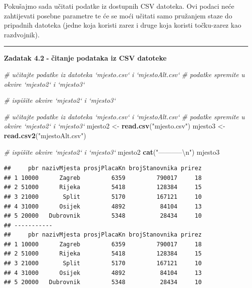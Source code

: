 \documentclass[]{book}
\newenvironment{Shaded}{\begin{snugshade}}{\end{snugshade}}
\newcommand{\KeywordTok}[1]{\textcolor[rgb]{0.13,0.29,0.53}{\textbf{#1}}}
\newcommand{\CharTok}[1]{\textcolor[rgb]{0.31,0.60,0.02}{#1}}
\newcommand{\StringTok}[1]{\textcolor[rgb]{0.31,0.60,0.02}{#1}}
\newcommand{\CommentTok}[1]{\textcolor[rgb]{0.56,0.35,0.01}{\textit{#1}}}
\newcommand{\NormalTok}[1]{#1}
\theoremstyle{definition}
\theoremstyle{definition}
\theoremstyle{definition}
\theoremstyle{remark}
\begin{document}
Pokušajmo sada učitati podatke iz dostupnih CSV datoteka. Ovi podaci
neće zahtijevati posebne parametre te će se moći učitati samo pružanjem
staze do pripadnih datoteka (jedne koja koristi zarez i druge koja
koristi točku-zarez kao razdvojnik).

\begin{center}\rule{0.5\linewidth}{\linethickness}\end{center}

\textbf{Zadatak 4.2} \textbf{-} \textbf{čitanje podataka iz CSV
datoteke}

\begin{Shaded}
\begin{Highlighting}[]
\CommentTok{# učitajte podatke iz datoteka `mjesto.csv` i `mjestoAlt.csv`}
\CommentTok{# podatke spremite u okvire `mjesto2` i `mjesto3`}

\CommentTok{# ispišite okvire `mjesto2` i `mjesto3`}
\end{Highlighting}
\end{Shaded}

\begin{Shaded}
\begin{Highlighting}[]
\CommentTok{# učitajte podatke iz datoteka `mjesto.csv` i `mjestoAlt.csv`}
\CommentTok{# podatke spremite u okvire `mjesto2` i `mjesto3`}
\NormalTok{mjesto2 <-}\StringTok{ }\KeywordTok{read.csv}\NormalTok{(}\StringTok{"mjesto.csv"}\NormalTok{)}
\NormalTok{mjesto3 <-}\StringTok{ }\KeywordTok{read.csv2}\NormalTok{(}\StringTok{"mjestoAlt.csv"}\NormalTok{)}

\CommentTok{# ispišite okvire `mjesto2` i `mjesto3`}
\NormalTok{mjesto2}
\KeywordTok{cat}\NormalTok{(}\StringTok{"-----------}\CharTok{\textbackslash{}n}\StringTok{"}\NormalTok{)}
\NormalTok{mjesto3}
\end{Highlighting}
\end{Shaded}

\begin{verbatim}
##     pbr nazivMjesta prosjPlacaKn brojStanovnika prirez
## 1 10000      Zagreb         6359         790017     18
## 2 51000      Rijeka         5418         128384     15
## 3 21000       Split         5170         167121     10
## 4 31000      Osijek         4892          84104     13
## 5 20000   Dubrovnik         5348          28434     10
## -----------
##     pbr nazivMjesta prosjPlacaKn brojStanovnika prirez
## 1 10000      Zagreb         6359         790017     18
## 2 51000      Rijeka         5418         128384     15
## 3 21000       Split         5170         167121     10
## 4 31000      Osijek         4892          84104     13
## 5 20000   Dubrovnik         5348          28434     10
\end{verbatim}
\end{document}
